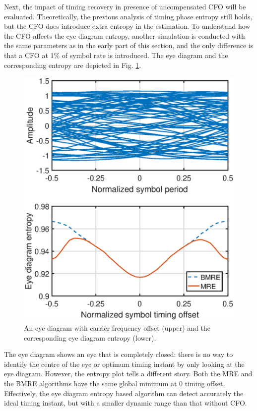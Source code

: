 \documentclass[journal,comsoc, onecolumn, 12pt,draftclsnofoot]{IEEEtran} %
\begin{document}
Next, the impact of timing recovery in presence of uncompensated CFO will be evaluated.  
Theoretically, the previous analysis of timing phase entropy still holds, but the CFO does introduce extra entropy in the estimation.
To understand how the CFO affects the eye diagram entropy, another simulation is conducted with the same parameters as in the early part of this section,
and the only difference is that a CFO at 1\% of symbol rate is introduced.
The eye diagram and the corresponding entropy are depicted in Fig. \ref{fig:timing_freq}.
      
\begin{figure}[ht]
\centering
\includegraphics[width=3 in]{pic/timing_freq.eps}
\caption{An eye diagram with carrier frequency offset (upper) and the corresponding eye diagram entropy (lower).}
\label{fig:timing_freq} 
\end{figure}

The eye diagram shows an eye that is completely closed: there is no way to identify the centre of the eye or optimum timing instant by only looking at the eye diagram.
However, the entropy plot tells a different story.
Both the MRE and the BMRE algorithms have the same global minimum at 0 timing offset. 
Effectively, the eye diagram entropy based algorithm can detect accurately the ideal timing instant,
but with a smaller dynamic range than that without CFO.
\end{document}
